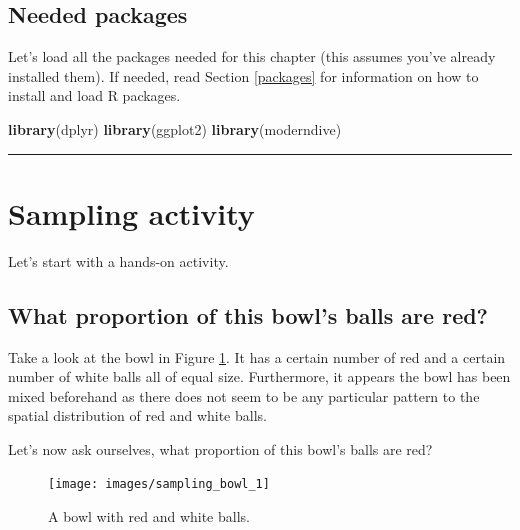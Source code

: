 \documentclass[12pt, krantz2,]{krantz}
\makeatletter
\newenvironment{Shaded}{\begin{snugshade}}{\end{snugshade}}
\newcommand{\KeywordTok}[1]{\textcolor[rgb]{0.27,0.27,0.27}{\textbf{#1}}}
\newcommand{\NormalTok}[1]{#1}
\newenvironment{kframe}{%
\medskip{}
\setlength{\fboxsep}{.8em}
 \def\at@end@of@kframe{}%
 \ifinner\ifhmode%
  \def\at@end@of@kframe{\end{minipage}}%
  \begin{minipage}{\columnwidth}%
 \fi\fi%
 \def\FrameCommand##1{\hskip\@totalleftmargin \hskip-\fboxsep
 \colorbox{shadecolor}{##1}\hskip-\fboxsep
     \hskip-\linewidth \hskip-\@totalleftmargin \hskip\columnwidth}%
 \MakeFramed {\advance\hsize-\width
   \@totalleftmargin\z@ \linewidth\hsize
   \@setminipage}}%
 {\par\unskip\endMakeFramed%
 \at@end@of@kframe}
\renewenvironment{Shaded}{\begin{kframe}}{\end{kframe}}
\makeatother
\begin{document}
\hypertarget{needed-packages-5}{%
\subsection*{Needed packages}\label{needed-packages-5}}


Let's load all the packages needed for this chapter (this assumes you've already installed them). If needed, read Section \ref{packages} for information on how to install and load R packages.

\begin{Shaded}
\begin{Highlighting}[]
\KeywordTok{library}\NormalTok{(dplyr)}
\KeywordTok{library}\NormalTok{(ggplot2)}
\KeywordTok{library}\NormalTok{(moderndive)}
\end{Highlighting}
\end{Shaded}

\begin{center}\rule{0.5\linewidth}{\linethickness}\end{center}

\hypertarget{sampling-activity}{%
\section{Sampling activity}\label{sampling-activity}}

Let's start with a hands-on activity.

\hypertarget{what-proportion-of-this-bowls-balls-are-red}{%
\subsection{What proportion of this bowl's balls are red?}\label{what-proportion-of-this-bowls-balls-are-red}}

Take a look at the bowl in Figure \ref{fig:sampling-exercise-1}. It has a certain number of red and a certain number of white balls all of equal size. Furthermore, it appears the bowl has been mixed beforehand as there does not seem to be any particular pattern to the spatial distribution of red and white balls.

Let's now ask ourselves, what proportion of this bowl's balls are red?

\begin{figure}

{\centering \texttt{[image: images/sampling\_bowl\_1]} 

}

\caption{A bowl with red and white balls.}\label{fig:sampling-exercise-1}
\end{figure}
\end{document}
